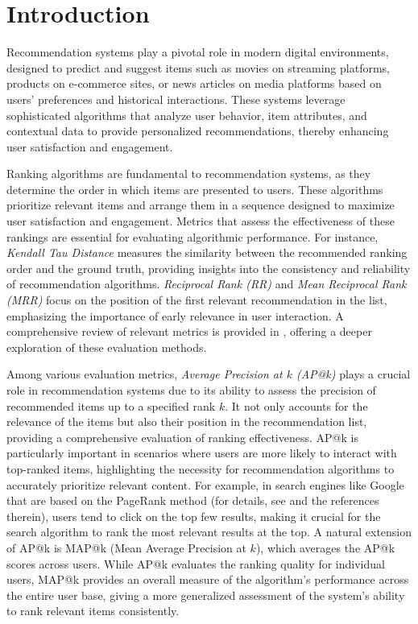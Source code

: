 \documentclass{tpms-l}
\theoremstyle{definition}
\theoremstyle{remark}
\numberwithin{equation}{section}
\begin{document}
\maketitle

\section{Introduction} 
Recommendation systems play a pivotal role in modern digital environments, designed to predict and suggest items such as movies on streaming platforms, products on e-commerce sites,  or news articles on media platforms based on users' preferences and historical interactions.  These systems leverage sophisticated algorithms that analyze user behavior,  item attributes,  and contextual data to provide personalized recommendations, thereby enhancing user satisfaction and engagement.

Ranking algorithms are fundamental to recommendation systems, as they determine the order in which items are presented to users. These algorithms prioritize relevant items and arrange them in a sequence designed to maximize user satisfaction and engagement. Metrics that assess the effectiveness of these rankings are essential for evaluating algorithmic performance. For instance, \textit{Kendall Tau Distance} measures the similarity between the recommended ranking order and the ground truth, providing insights into the consistency and reliability of recommendation algorithms. \textit{Reciprocal Rank (RR)} and  \textit{Mean Reciprocal Rank (MRR)} focus on the position of the first relevant recommendation in the list, emphasizing the importance of early relevance in user interaction. A comprehensive review of relevant metrics is provided in \cite{arXiv:2312.16015}, offering a deeper exploration of these evaluation methods.

Among various evaluation metrics, \textit{Average Precision at $k$ (AP@k)} plays a crucial role in recommendation systems due to its ability to assess the precision of recommended items up to a specified rank $k$. It not only accounts for the relevance of the items but also their position in the recommendation list, providing a comprehensive evaluation of ranking effectiveness. AP@k is particularly important in scenarios where users are more likely to interact with top-ranked items, highlighting the necessity for recommendation algorithms to accurately prioritize relevant content. For example, in search engines like Google that are based on the PageRank method (for details, see \cite{BrinPage1998, EngstromSilvestrov2017} and the references therein), users tend to click on the top few results, making it crucial for the search algorithm to rank the most relevant results at the top.
A natural extension of AP@k is MAP@k (Mean Average Precision at $k$), which averages the AP@k scores across users. While AP@k evaluates the ranking quality for individual users, MAP@k provides an overall measure of the algorithm's performance across the entire user base, giving a more generalized assessment of the system’s ability to rank relevant items consistently.
\end{document}
